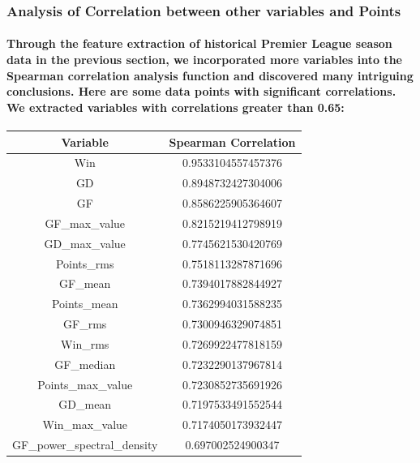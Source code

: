 \subsubsection*{\textbf{Analysis of Correlation between other variables and Points}}
% 
\paragraph{Through the feature extraction of historical Premier League season data in the previous section, we incorporated more variables into the Spearman correlation analysis function and discovered many intriguing conclusions. Here are some data points with significant correlations. We extracted variables with correlations greater than 0.65:}
% 
% 
\begin{center}
    \begin{tabular}{cc}
        \hline
        Variable                          & Spearman Correlation \\
        \hline
        Win                               & 0.9533104557457376   \\
        GD                                & 0.8948732427304006   \\
        GF                                & 0.8586225905364607   \\
        GF\_max\_value                    & 0.8215219412798919   \\
        GD\_max\_value                    & 0.7745621530420769   \\
        Points\_rms                       & 0.7518113287871696   \\
        GF\_mean                          & 0.7394017882844927   \\
        Points\_mean                      & 0.7362994031588235   \\
        GF\_rms                           & 0.7300946329074851   \\
        Win\_rms                          & 0.7269922477818159   \\
        GF\_median                        & 0.7232290137967814   \\
        Points\_max\_value                & 0.7230852735691926   \\
        GD\_mean                          & 0.7197533491552544   \\
        Win\_max\_value                   & 0.7174050173932447   \\
        GF\_power\_spectral\_density      & 0.697002524900347    \\

\end{tabular}
\end{center}
